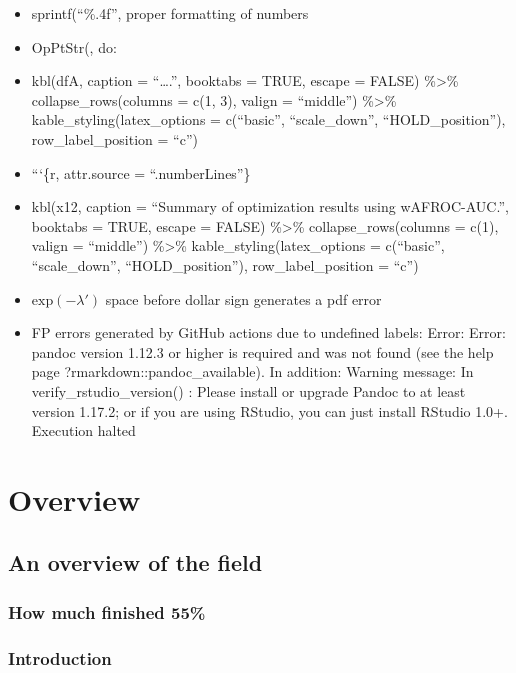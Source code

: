 \documentclass[
]{book}
\providecommand{\tightlist}{%
  \setlength{\itemsep}{0pt}\setlength{\parskip}{0pt}}
\begin{document}
\begin{itemize}
\tightlist
\item
  sprintf(``\%.4f'', proper formatting of numbers
\item
  OpPtStr(, do:
\item
  kbl(dfA, caption = ``\ldots.'', booktabs = TRUE, escape = FALSE) \%\textgreater\% collapse\_rows(columns = c(1, 3), valign = ``middle'') \%\textgreater\% kable\_styling(latex\_options = c(``basic'', ``scale\_down'', ``HOLD\_position''), row\_label\_position = ``c'')
\item
  ```\{r, attr.source = ``.numberLines''\}
\item
  kbl(x12, caption = ``Summary of optimization results using wAFROC-AUC.'', booktabs = TRUE, escape = FALSE) \%\textgreater\% collapse\_rows(columns = c(1), valign = ``middle'') \%\textgreater\% kable\_styling(latex\_options = c(``basic'', ``scale\_down'', ``HOLD\_position''), row\_label\_position = ``c'')
\item
  \(\text{exp} \left ( -\lambda' \right )\) space before dollar sign generates a pdf error
\item
  FP errors generated by GitHub actions due to undefined labels:
  Error: Error: pandoc version 1.12.3 or higher is required and was not found (see the help page ?rmarkdown::pandoc\_available).
  In addition: Warning message:
  In verify\_rstudio\_version() :
  Please install or upgrade Pandoc to at least version 1.17.2; or if you are using RStudio, you can just install RStudio 1.0+.
  Execution halted
\end{itemize}

\hypertarget{part-overview}{%
\part*{Overview}\label{part-overview}}

\hypertarget{overview}{%
\chapter{An overview of the field}\label{overview}}

\hypertarget{overview-how-much-finished}{%
\section{How much finished 55\%}\label{overview-how-much-finished}}

\hypertarget{preliminaries-intro}{%
\section{Introduction}\label{preliminaries-intro}}
\end{document}
